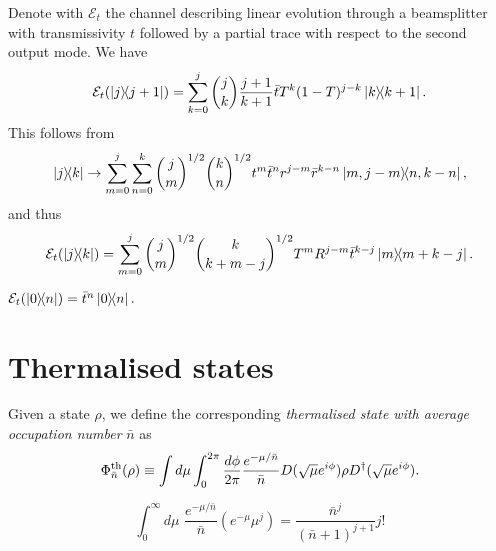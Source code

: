 \documentclass[12pt]{report}
\newcommand{\calE}{{\mathcal{E}}}
\begin{document}
\begin{example}
	Denote with $\calE_t$ the channel describing linear evolution through a beamsplitter with transmissivity $t$ followed by a partial trace with respect to the second output mode. We have
	\begin{equation}
		\calE_t(\ketbra{j}{j+1})
		= \sum_{k=0}^j \binom{j}{k} \frac{j+1}{k+1}
		\bar t T^k (1-T)^{j-k} \ketbra{k}{k+1}.
	\end{equation}
	This follows from
	\begin{equation}
		\ketbra{j}{k} \to
		\sum_{m=0}^j \sum_{n=0}^k
		\binom{j}{m}^{1/2} \binom{k}{n}^{1/2}
		t^{m} \bar t^n r^{j-m} \bar r^{k-n}
		\ketbra{m,j-m}{n,k-n},
	\end{equation}
	and thus
	\begin{equation}
		\calE_t(\ketbra{j}{k})
		= \sum_{m=0}^j \binom{j}{m}^{1/2} \binom{k}{k+m-j}^{1/2}
		T^m R^{j-m} \bar t^{k-j}
		\ketbra{m}{m+k-j}.
	\end{equation}
\end{example}

\begin{example}
		$\calE_t(\ketbra{0}{n})
				= \bar t^n \ketbra{0}{n}.$
\end{example}

\section{Thermalised states}

\begin{defn}
	Given a state $\rho$, we define the corresponding \emph{thermalised state with average occupation number} $\bar n$ as
	\begin{equation}
		\Phi_{\bar n}^{\rm th}(\rho)
		\equiv \int d\mu\int_0^{2\pi} \frac{d\phi}{2\pi} \frac{e^{-\mu/\bar n}}{\bar n}
		D(\sqrt\mu e^{i\phi})\rho D^\dagger(\sqrt\mu e^{i\phi}).
	\end{equation}
\end{defn}

\begin{prop}\label{prop:integration_formula_for_thermalisation}
	\begin{equation}
		\int_0^\infty d\mu \,\, \frac{e^{-\mu/\bar n}}{\bar n}
		(e^{-\mu}\mu^j)
		= \frac{\bar n^j}{(\bar n+1)^{j+1}} j!
	\end{equation}
\end{prop}
\end{document}
